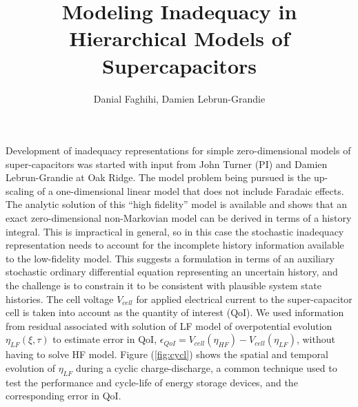\documentclass[]{article}
\begin{document}
\title{Modeling Inadequacy in Hierarchical Models of Supercapacitors}
\author{Danial Faghihi,
Damien Lebrun-Grandie
}
\maketitle

Development of inadequacy representations for simple zero-dimensional
models of super-capacitors was started with input from John Turner (PI) and Damien
Lebrun-Grandie at Oak Ridge. The model problem being pursued is the
up-scaling of a one-dimensional linear model that does not include
Faradaic effects. The analytic solution of this ``high fidelity'' model
is available and shows that an exact zero-dimensional non-Markovian
model can be derived in terms of a history integral. This is
impractical in general, so in this case the stochastic inadequacy
representation needs to account for the incomplete history information
available to the low-fidelity model. This suggests a formulation in
terms of an auxiliary stochastic ordinary differential equation
representing an uncertain history, and the challenge is to constrain it
to be consistent with plausible system state histories.
The cell voltage $V_{cell}$ for applied electrical current to the super-capacitor cell is taken into account as the quantity of interest (QoI). We used information from residual associated with solution of LF model of overpotential evolution $\eta_{LF}(\xi,\tau)$ to estimate error in QoI, $\epsilon_{QoI}=V_{cell}(\eta_{HF})-V_{cell}(\eta_{LF})$, without having to solve HF model. 
Figure (\ref{fig:cycl}) shows the spatial and temporal evolution of $\eta_{LF}$ during a cyclic charge-discharge, a common technique used to test the performance and cycle-life of energy storage devices, and the corresponding error in QoI.
\end{document}
